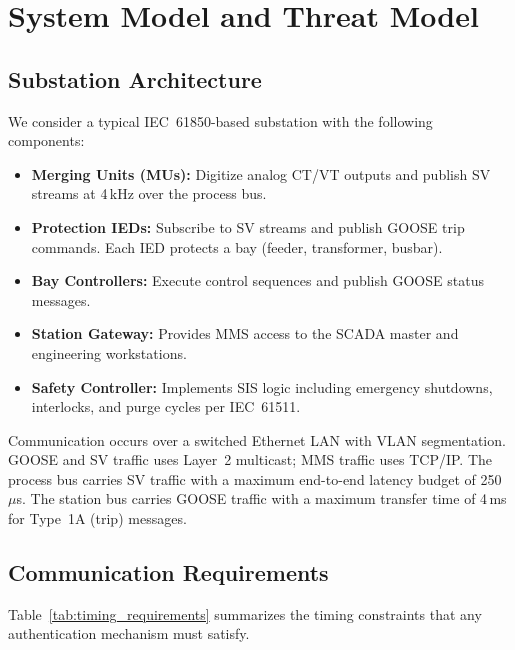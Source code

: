 \documentclass[conference,10pt]{IEEEtran}
\newcommand{\GOOSE}{\textsf{GOOSE}}
\newcommand{\SV}{\textsf{SV}}
\newcommand{\MMS}{\textsf{MMS}}
\begin{document}
\section{System Model and Threat Model}
\label{sec:system_model}

\subsection{Substation Architecture}

We consider a typical IEC~61850-based substation with the following components:

\begin{itemize}
  \item \textbf{Merging Units (MUs):} Digitize analog CT/VT outputs and publish \SV{} streams at 4\,kHz over the process bus.
  \item \textbf{Protection IEDs:} Subscribe to \SV{} streams and publish \GOOSE{} trip commands. Each IED protects a bay (feeder, transformer, busbar).
  \item \textbf{Bay Controllers:} Execute control sequences and publish \GOOSE{} status messages.
  \item \textbf{Station Gateway:} Provides \MMS{} access to the SCADA master and engineering workstations.
  \item \textbf{Safety Controller:} Implements SIS logic including emergency shutdowns, interlocks, and purge cycles per IEC~61511.
\end{itemize}

Communication occurs over a switched Ethernet LAN with VLAN segmentation. \GOOSE{} and \SV{} traffic uses Layer~2 multicast; \MMS{} traffic uses TCP/IP. The process bus carries \SV{} traffic with a maximum end-to-end latency budget of 250\,$\mu$s. The station bus carries \GOOSE{} traffic with a maximum transfer time of 4\,ms for Type~1A (trip) messages.

\subsection{Communication Requirements}

Table~\ref{tab:timing_requirements} summarizes the timing constraints that any authentication mechanism must satisfy.
\end{document}
